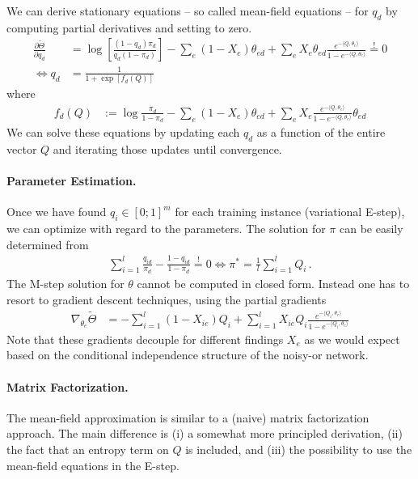 \documentclass{article}
\begin{document}
We can derive stationary equations -- so called mean-field equations -- for $q_d$ by computing partial derivatives and setting to zero. 
\begin{align}
\nonumber \frac{\partial \tilde\Theta}{\partial q_d} & = 
\log \left[ \frac{(1-q_d)\pi_d}{q_d (1-\pi_d)}  \right] - \sum_{e} (1-X_{e}) \theta_{ed} + 
\sum_{e} X_e \theta_{ed} \frac{e^{-\langle Q, \theta_e \rangle}}{1 - e^{-\langle Q, \theta_e \rangle}}  \stackrel{!}{=}0 \\
\iff  q_d & =  \frac{1}{1 +  \exp[f_d(Q)]}
\end{align}
where 
\begin{align}
f_d(Q) & := \log \frac{\pi_d}{1-\pi_d} - \sum_{e} (1-X_e) \theta_{ed} + 
\sum_{e} X_e \frac{e^{-\langle Q, \theta_e \rangle}}{1 - e^{-\langle Q, \theta_e \rangle}} \theta_{ed} 
\end{align}
We can solve these equations by updating each $q_d$ as a function of the entire vector $Q$ and iterating those updates until convergence.


\paragraph{Parameter Estimation.}

Once we have found $q_i \in[0;1]^m$ for each training instance (variational E-step), we can optimize  with regard to the parameters. The solution for $\pi$ can be easily determined from 
\begin{align}
\sum_{i=1}^l \frac{q_{id}}{\pi_d} - \frac{1-q_{id}}{1-\pi_d} \stackrel != 0 \iff \pi^* = \frac 1l \sum_{i=1}^l Q_{i} \,.
\end{align}
The M-step solution for $\theta$ cannot be computed in closed form. Instead one has to resort to gradient descent techniques, using the partial gradients  
\begin{align}
\nabla_{\theta_e} \tilde \Theta & =  -  \sum_{i=1}^l (1-X_{ie}) Q_{i} + \sum_{i=1}^l X_{ie} Q_{i} \frac{e^{-\langle Q_i, \theta_e \rangle}}{1 - e^{-\langle Q_i, \theta_e \rangle}}  
\end{align}
Note that these gradients decouple for different findings $X_e$ as we would expect based on the conditional independence structure of the noisy-or network. 

\paragraph{Matrix Factorization.} The mean-field approximation is similar to a (naive) matrix factorization approach. The main difference is (i) a somewhat more principled derivation, (ii) the fact that an entropy term on $Q$ is included, and (iii) the possibility to use the mean-field equations in the E-step. 
\end{document}
